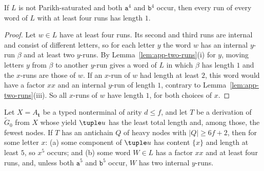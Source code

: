 \begin{lemma}\label{lem:app-two-alternate}
If $L$ is not Parikh-saturated and both $\mathtt a^4$ and $\mathtt b^4$ occur,
then every run of every word of $L$ with at least four runs has length $1$.
\end{lemma}

\begin{proof}
Let $w\in L$ have at least four runs.  Its second and third runs are internal
and consist of different letters, so for each letter $y$ the word $w$ has an
internal $y$-run $\beta$ and at least two $y$-runs.  By
Lemma~\ref{lem:app-two-runs}(i) for $y$, moving letters $y$ from $\beta$ to another
$y$-run gives a word of $L$ in which $\beta$ has length $1$ and the $x$-runs are
those of $w$.  If an $x$-run of $w$ had length at least $2$, this word would
have a factor $xx$ and an internal $y$-run of length $1$, contrary to
Lemma~\ref{lem:app-two-runs}(iii).  So all $x$-runs of $w$ have length $1$, for
both choices of $x$.
\end{proof}

\begin{lemma}\label{lem:app-two-insertion}
Let $X=A_{\mathbf t}$ be a typed nonterminal of arity $d\le f$, and let $T$ be a
derivation of $\widetilde G_0$ from $X$ whose yield $\tuple u$ has the least total
length and, among those, the fewest nodes.  If $T$ has an antichain $Q$ of
heavy nodes with $|Q|\ge6f+2$, then for some letter $x$:
\textup{(a)} some component of $\tuple u$ has content $\{x\}$ and length at least
$5$, so $x^5$ occurs; and
\textup{(b)} some word $W\in L$ has a factor $xx$ and at least four runs, and,
unless both $\mathtt a^5$ and $\mathtt b^5$ occur, $W$ has two internal $y$-runs.
\end{lemma}

